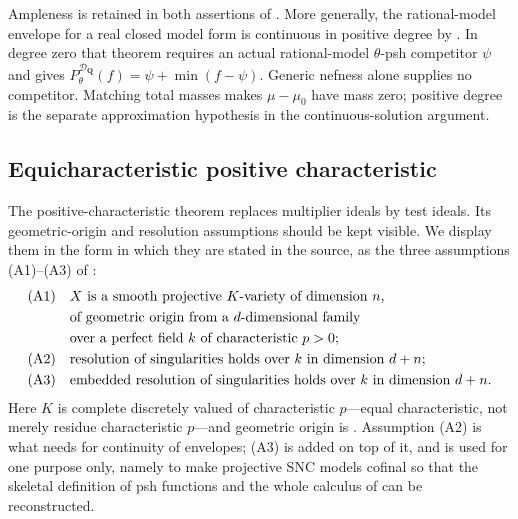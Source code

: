 \begin{remark}
\label{rem:ch29-curve-nef-ample}
Ampleness is retained in both assertions of
.  More generally, the
rational-model envelope for a real closed model form is continuous in
positive degree by .  In degree zero that
theorem requires an actual rational-model \(\theta\)-psh competitor
\(\psi\) and gives
\(P^{\mathcal D_{\mathbf Q}}_\theta(f)
  =\psi+\min(f-\psi)\).
Generic nefness alone supplies no competitor.  Matching total masses
makes \(\mu-\mu_0\) have mass zero; positive degree is the separate
approximation hypothesis in the continuous-solution argument.
\end{remark}

\subsection{Equicharacteristic positive characteristic}
\label{sec:ch29-later-positive}

The positive-characteristic theorem replaces multiplier ideals by test
ideals.  Its geometric-origin and resolution assumptions should be kept
visible.  We display them in the form in which they are stated in the
source, as the three assumptions \textup{(A1)}--\textup{(A3)} of
\cite[\S9]{GJKM19}:
\begin{equation}
\label{eq:ch29-gjkm-assumptions}
\begin{aligned}
 \textup{(A1)}\quad&\text{\(X\) is a smooth projective \(K\)-variety of
   dimension \(n\),}\\
 &\text{of geometric origin from a \(d\)-dimensional family}\\
 &\text{over a perfect field \(k\) of characteristic \(p>0\); }\\
 \textup{(A2)}\quad&\text{resolution of singularities holds over \(k\) in
   dimension \(d+n\);}\\
 \textup{(A3)}\quad&\text{embedded resolution of singularities holds over
   \(k\) in dimension \(d+n\).}
\end{aligned}
\end{equation}
Here \(K\) is complete discretely valued of characteristic \(p\)---equal
characteristic, not merely residue characteristic \(p\)---and geometric
origin is .  Assumption \textup{(A2)} is
what  needs for continuity of
envelopes; \textup{(A3)} is added on top of it, and is used for one purpose
only, namely to make projective SNC models cofinal so that the skeletal
definition of psh functions and the whole calculus of
 can be
reconstructed.

